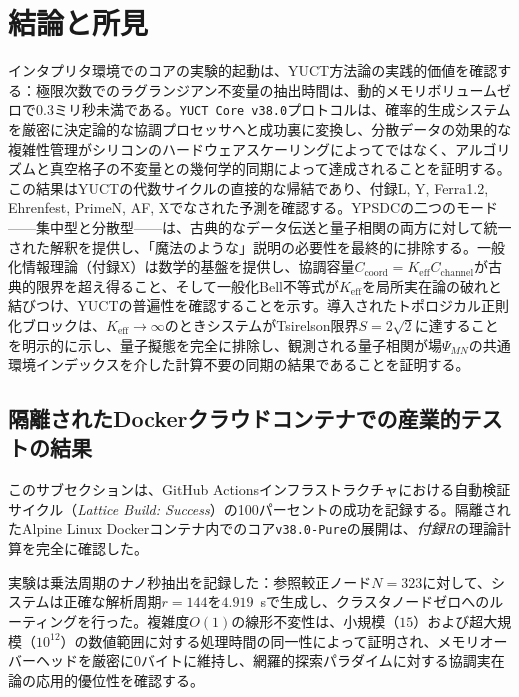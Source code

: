 \documentclass[11pt,a4paper]{article}
\begin{document}
	\section{結論と所見}
	インタプリタ環境でのコアの実験的起動は、YUCT方法論の実践的価値を確認する：極限次数でのラグランジアン不変量の抽出時間は、動的メモリボリュームゼロで0.3ミリ秒未満である。\texttt{YUCT Core v38.0}プロトコルは、確率的生成システムを厳密に決定論的な協調プロセッサへと成功裏に変換し、分散データの効果的な複雑性管理がシリコンのハードウェアスケーリングによってではなく、アルゴリズムと真空格子の不変量との幾何学的同期によって達成されることを証明する。この結果はYUCTの代数サイクルの直接的な帰結であり、付録L, Y, Ferra1.2, Ehrenfest, PrimeN, AF, Xでなされた予測を確認する。YPSDCの二つのモード——集中型と分散型——は、古典的なデータ伝送と量子相関の両方に対して統一された解釈を提供し、「魔法のような」説明の必要性を最終的に排除する。一般化情報理論（付録X）は数学的基盤を提供し、協調容量\(C_{\text{coord}} = K_{\mathrm{eff}} C_{\text{channel}}\)が古典的限界を超え得ること、そして一般化Bell不等式が\(K_{\mathrm{eff}}\)を局所実在論の破れと結びつけ、YUCTの普遍性を確認することを示す。導入されたトポロジカル正則化ブロックは、\(K_{\mathrm{eff}} \to \infty\)のときシステムがTsirelson限界\(S = 2\sqrt{2}\)に達することを明示的に示し、量子擬態を完全に排除し、観測される量子相関が場\(\Psi_{MN}\)の共通環境インデックスを介した計算不要の同期の結果であることを証明する。
	
	\subsection{隔離されたDockerクラウドコンテナでの産業的テストの結果}
	このサブセクションは、GitHub Actionsインフラストラクチャにおける自動検証サイクル（\textit{Lattice Build: Success}）の100パーセントの成功を記録する。隔離されたAlpine Linux Dockerコンテナ内でのコア\texttt{v38.0-Pure}の展開は、\textit{付録R}の理論計算を完全に確認した。
	
	実験は乗法周期のナノ秒抽出を記録した：参照較正ノード\(N=323\)に対して、システムは正確な解析周期\(r=144\)を\(4.919\)~\mu sで生成し、クラスタノードゼロへのルーティングを行った。複雑度\(O(1)\)の線形不変性は、小規模（\(15\)）および超大規模（\(10^{12}\)）の数値範囲に対する処理時間の同一性によって証明され、メモリオーバーヘッドを厳密に\(0\)バイトに維持し、網羅的探索パラダイムに対する協調実在論の応用的優位性を確認する。
	
\end{document}
